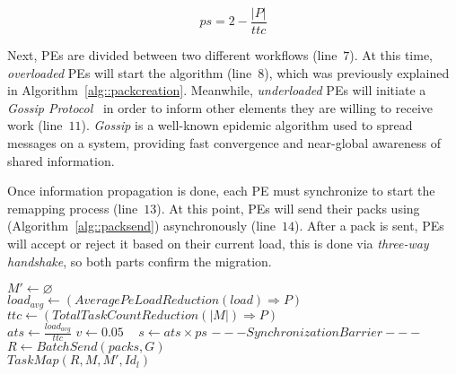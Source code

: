 \begin{equation}
	ps = 2-\frac{|P|}{ttc}
	\label{eq:ps}
\end{equation}

Next, PEs are divided between two different workflows (line~$7$).
At this time, \textit{overloaded} PEs will start the \batchassembly algorithm (line~$8$), which was previously explained in Algorithm~\ref{alg::packcreation}.
Meanwhile, \textit{underloaded} PEs will initiate a \textit{Gossip Protocol}~\cite{gossip} in order to inform other elements they are willing to receive work (line~$11$).
\textit{Gossip} is a well-known epidemic algorithm used to spread messages on a system, providing fast convergence and near-global awareness of shared information.

Once information propagation is done, each PE must synchronize to start the remapping process (line~$13$). 
At this point, PEs will send their packs using \batchsend (Algorithm~\ref{alg::packsend}) asynchronously (line~$14$).
After a pack is sent, PEs will accept or reject it based on their current load, this is done via \textit{three-way handshake}, so both parts confirm the migration.

\begin{algorithm}[t]
	\DontPrintSemicolon
    $  M' \gets \varnothing$\\
    $load_{avg} \gets (AveragePeLoadReduction(load)\Rightarrow  P)$ \\
    $ttc \gets (TotalTaskCountReduction(|M|)\Rightarrow  P)$\\
    $ats\gets \frac{load_{avg}}{ttc}$ \qquad\qquad\qquad {}
    $v \gets 0.05$ \qquad \qquad\ 
    $s \gets ats\times ps$ \qquad\qquad\qquad\qquad\qquad {}
    $---Synchronization Barrier---$\\
    $R \gets BatchSend(packs, G)$\\
    $TaskMap(R,M, M',Id_{l})$
    \caption{\packdrop}
    \label{alg::packdrop}    
\end{algorithm}

